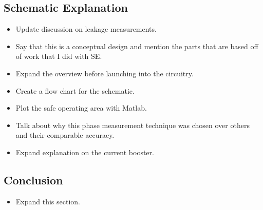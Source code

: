 \subsection{Schematic Explanation}
\begin{itemize}
    \item Update discussion on leakage measurements.
    \item Say that this is a conceptual design and mention the parts that are based off of work that I did with SE.
    \item Expand the overview before launching into the circuitry.
    \item Create a flow chart for the schematic.
    \item Plot the safe operating area with Matlab.
    \item Talk about why this phase measurement technique was chosen over others and their comparable accuracy.
    \item Expand explanation on the current booster.
\end{itemize}

\subsection{Conclusion}
\begin{itemize}
    \item Expand this section.
\end{itemize}

